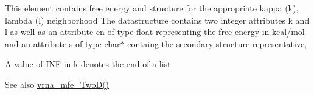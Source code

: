 This element contains free energy and structure for the appropriate kappa (k), lambda (l) neighborhood The datastructure contains two integer attributes \textquotesingle{}k\textquotesingle{} and \textquotesingle{}l\textquotesingle{} as well as an attribute \textquotesingle{}en\textquotesingle{} of type float representing the free energy in kcal/mol and an attribute \textquotesingle{}s\textquotesingle{} of type char$\ast$ containg the secondary structure representative,

A value of \hyperlink{energy__const_8h_a12c2040f25d8e3a7b9e1c2024c618cb6}{I\+N\+F} in k denotes the end of a list

\begin{DoxySeeAlso}{See also}
\hyperlink{group__kl__neighborhood__mfe_ga243c288b463147352829df04de6a2f77}{vrna\+\_\+mfe\+\_\+\+Two\+D()} 
\end{DoxySeeAlso}
